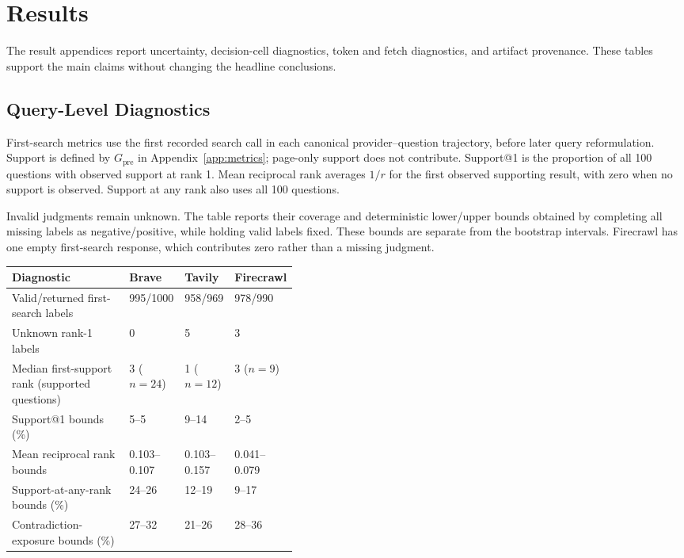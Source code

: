 \section{Results}
\label{app:additional}
The result appendices report uncertainty, decision-cell diagnostics, token and fetch diagnostics, and artifact provenance. These tables support the main claims without changing the headline conclusions.

\subsection{Query-Level Diagnostics}
\label{app:query-diagnostics}
First-search metrics use the first recorded search call in each canonical provider--question trajectory, before later query reformulation. Support is defined by $G_{\mathrm{pre}}$ in Appendix~\ref{app:metrics}; page-only support does not contribute. Support@1 is the proportion of all 100 questions with observed support at rank 1. Mean reciprocal rank averages $1/r$ for the first observed supporting result, with zero when no support is observed. Support at any rank also uses all 100 questions.

Invalid judgments remain unknown. The table reports their coverage and deterministic lower/upper bounds obtained by completing all missing labels as negative/positive, while holding valid labels fixed. These bounds are separate from the bootstrap intervals. Firecrawl has one empty first-search response, which contributes zero rather than a missing judgment.

\begin{center}
\footnotesize
\setlength{\tabcolsep}{3pt}
\begin{tabularx}{\linewidth}{@{}L{0.42\linewidth}YYY@{}}
\toprule
\textbf{Diagnostic} & \textbf{Brave} & \textbf{Tavily} & \textbf{Firecrawl} \\
\midrule
Valid/returned first-search labels & 995/1000 & 958/969 & 978/990 \\
Unknown rank-1 labels & 0 & 5 & 3 \\
Median first-support rank (supported questions) & 3 ($n=24$) & 1 ($n=12$) & 3 ($n=9$) \\
\midrule
Support@1 bounds (\%) & 5--5 & 9--14 & 2--5 \\
Mean reciprocal rank bounds & 0.103--0.107 & 0.103--0.157 & 0.041--0.079 \\
Support-at-any-rank bounds (\%) & 24--26 & 12--19 & 9--17 \\
Contradiction-exposure bounds (\%) & 27--32 & 21--26 & 28--36 \\
\bottomrule
\end{tabularx}
\label{tab:app-query-coverage}
\end{center}

